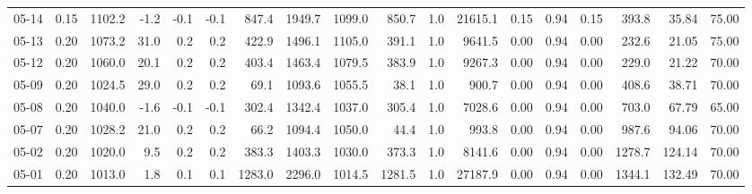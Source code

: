 \begin{threeparttable}
{\begin{tabular}{lrrrrrrrrrrrrrrrrr}
  05-14 &     0.15 & 1102.2 &              -1.2 &              -0.1 &               -0.1 &              847.4 & 1949.7 & 1099.0 &      850.7 &                      1.0 &             21615.1 &       0.15 &      0.94 &           0.15 &            393.8 &           35.84 &                  75.00 \\
  05-13 &     0.20 & 1073.2 &              31.0 &               0.2 &                0.2 &              422.9 & 1496.1 & 1105.0 &      391.1 &                      1.0 &              9641.5 &       0.00 &      0.94 &           0.00 &            232.6 &           21.05 &                  75.00 \\
  05-12 &     0.20 & 1060.0 &              20.1 &               0.2 &                0.2 &              403.4 & 1463.4 & 1079.5 &      383.9 &                      1.0 &              9267.3 &       0.00 &      0.94 &           0.00 &            229.0 &           21.22 &                  70.00 \\
  05-09 &     0.20 & 1024.5 &              29.0 &               0.2 &                0.2 &               69.1 & 1093.6 & 1055.5 &       38.1 &                      1.0 &               900.7 &       0.00 &      0.94 &           0.00 &            408.6 &           38.71 &                  70.00 \\
  05-08 &     0.20 & 1040.0 &              -1.6 &              -0.1 &               -0.1 &              302.4 & 1342.4 & 1037.0 &      305.4 &                      1.0 &              7028.6 &       0.00 &      0.94 &           0.00 &            703.0 &           67.79 &                  65.00 \\
  05-07 &     0.20 & 1028.2 &              21.0 &               0.2 &                0.2 &               66.2 & 1094.4 & 1050.0 &       44.4 &                      1.0 &               993.8 &       0.00 &      0.94 &           0.00 &            987.6 &           94.06 &                  70.00 \\
  05-02 &     0.20 & 1020.0 &               9.5 &               0.2 &                0.2 &              383.3 & 1403.3 & 1030.0 &      373.3 &                      1.0 &              8141.6 &       0.00 &      0.94 &           0.00 &           1278.7 &          124.14 &                  70.00 \\
  05-01 &     0.20 & 1013.0 &               1.8 &               0.1 &                0.1 &             1283.0 & 2296.0 & 1014.5 &     1281.5 &                      1.0 &             27187.9 &       0.00 &      0.94 &           0.00 &           1344.1 &          132.49 &                  70.00 \\

\end{tabular}}
\end{threeparttable}
